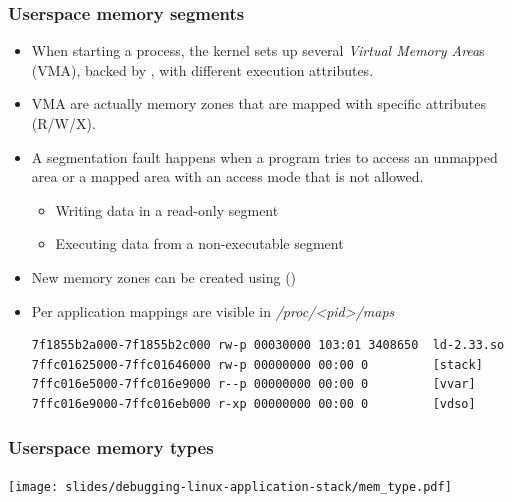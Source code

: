\begin{frame}[fragile]
  \frametitle{Userspace memory segments}
  \begin{itemize}
    \item When starting a process, the kernel sets up several {\em Virtual
          Memory Area}s (VMA), backed by , with
          different execution attributes.
    \item VMA are actually memory zones that are mapped with specific
          attributes (R/W/X).
    \item A segmentation fault happens when a program tries to access an
      unmapped area or a mapped area with an access mode that is not
      allowed.
    \begin{itemize}
      \item Writing data in a read-only segment
      \item Executing data from a non-executable segment
    \end{itemize}
    \item New memory zones can be created using 
          ()
    \item Per application mappings are visible in {\em /proc/<pid>/maps}\\
    \begin{verbatim}
7f1855b2a000-7f1855b2c000 rw-p 00030000 103:01 3408650  ld-2.33.so
7ffc01625000-7ffc01646000 rw-p 00000000 00:00 0         [stack]
7ffc016e5000-7ffc016e9000 r--p 00000000 00:00 0         [vvar]
7ffc016e9000-7ffc016eb000 r-xp 00000000 00:00 0         [vdso]
    \end{verbatim}
  \end{itemize}
\end{frame}

\begin{frame}[fragile]
  \frametitle{Userspace memory types}
  \center \texttt{[image: slides/debugging-linux-application-stack/mem\_type.pdf]}
\end{frame}

